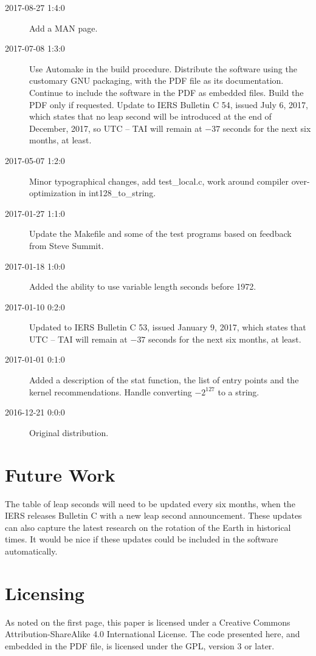\documentclass[letterpaper,twoside]{article}
\begin{document}
\begin{description}
\item[2017-08-27 1:4:0] Add a MAN page.
\item[2017-07-08 1:3:0] Use Automake in the build procedure.
  Distribute the software using the customary GNU packaging,
  with the PDF file as its documentation.  Continue to include
  the software in the PDF as embedded files.  Build the PDF
  only if requested.  Update to IERS Bulletin C 54, issued
  July 6, 2017, which states that no leap second will be introduced
  at the end of December, 2017, so UTC -- TAI will remain at
  $-37$ seconds for the next six months, at least.
\item[2017-05-07 1:2:0] Minor typographical changes, add test\_local.c,
  work around compiler over-optimization in int128\_to\_string.
\item[2017-01-27 1:1:0] Update the Makefile and some of the test programs
  based on feedback from Steve Summit.
\item[2017-01-18 1:0:0] Added the ability to use variable length seconds
  before 1972.
\item[2017-01-10 0:2:0] Updated to IERS Bulletin C 53,
  issued January 9, 2017, which states that UTC -- TAI
  will remain at $-37$ seconds for the next six months, at least.
\item[2017-01-01 0:1:0] Added a description of the stat function,
  the list of entry points and the kernel recommendations.
  Handle converting $-2^{127}$ to a string. 
\item[2016-12-21 0:0:0] Original distribution.
\end{description}

\section{Future Work}
The table of leap seconds will need to be updated every six months,
when the IERS releases Bulletin C with a new leap second announcement.
These updates can also capture the latest research on the rotation
of the Earth in historical times.  It would be nice if these updates
could be included in the software automatically.

\section{Licensing}
\label{section:Licensing}
As noted on the first page, this paper is licensed under a Creative
Commons Attribution-ShareAlike 4.0 International License.  The code
presented here, and embedded in the PDF file, is licensed under
the GPL, version 3 or later.
\end{document}
